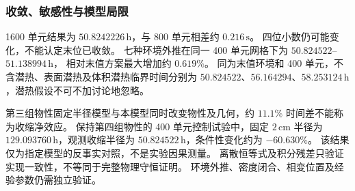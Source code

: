 \subsubsection{收敛、敏感性与模型局限}

1600 单元结果为 $50.8242226\,\mathrm h$，与 800 单元相差约 $0.216\,\mathrm s$。
四位小数仍可能变化，不能认定末位已收敛。
七种环境外推在同一 400 单元网格下为 $50.824522$--$51.138994\,\mathrm h$，
相对末值方案最大增加约 $0.619\%$。
同为末值环境和 400 单元，不含潜热、表面潜热及体积潜热临界时间分别为
$50.824522$、$56.164294$、$58.253124\,\mathrm h$，潜热假设不可不加讨论地忽略。

第三组物性固定半径模型与本模型同时改变物性及几何，约 $11.1\%$ 时间差不能称为收缩净效应。
保持第四组物性的 400 单元控制试验中，固定 $2\,\mathrm{cm}$ 半径为
$129.093760\,\mathrm h$，观测收缩半径为 $50.824522\,\mathrm h$，条件性变化约为 $-60.630\%$。
该结果仅为指定模型的反事实对照，不是实验因果测量。
离散恒等式及积分残差只验证实现一致性，不等同于完整物理守恒证明。
环境外推、密度闭合、相变位置及经验参数仍需独立验证。

